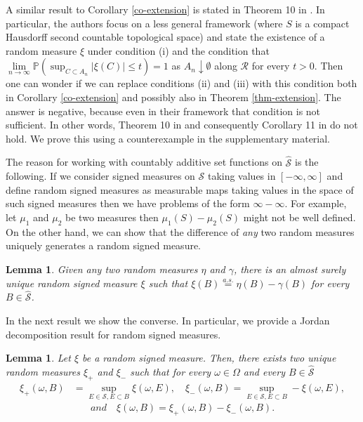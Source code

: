 \documentclass{article}
\theoremstyle{plain}
\newtheorem{lemma}[theorem]{Lemma}
\theoremstyle{remark}
\begin{document}
A similar result to Corollary \ref{co-extension} is stated in Theorem 10 in \citet{Jacob1995}. In particular, the authors focus on a less general framework (where $S$ is a compact Hausdorff second countable topological space) and state the existence of a random measure $\xi$ under condition (i) and the condition that $\lim\limits_{n\to\infty}\mathbb{P}(\sup_{C\subset A_n}|\xi(C)|\leq t)=1$ as $A_n\downarrow\emptyset$ along $\mathcal{R}$ for every $t>0$. Then one can wonder if we can replace conditions (ii) and (iii) with this condition both in Corollary \ref{co-extension} and possibly also in Theorem \ref{thm-extension}. The answer is negative, because even in their framework that condition is not sufficient. In other words, Theorem 10 in \citet{Jacob1995} and consequently Corollary 11 in \citet{Jacob1995} do not hold. We prove this using a counterexample in the supplementary material.

The reason for working with countably additive set functions on $\hat{\mathcal{S}}$ is the following. If we consider signed measures on $\mathcal{S}$ taking values in $[-\infty,\infty]$ and define random signed measures as measurable maps taking values in the space of such signed measures then we have problems of the form $\infty-\infty$. For example, let $\mu_1$ and $\mu_2$ be two measures then $\mu_1(S)-\mu_2(S)$ might not be well defined. On the other hand, we can show that the difference of \textit{any} two random measures uniquely generates a random signed measure.



\begin{lemma}\label{lem-uncited-2}
	Given any two random measures $\eta$ and $\gamma$, there is an almost surely unique random signed measure $\xi$ such that $\xi(B)\stackrel{a.s.}{=} \eta(B)-\gamma(B)$ for every $B\in\hat{\mathcal{S}}$.
\end{lemma}


In the next result we show the converse. In particular, we provide a Jordan decomposition result for random signed measures.
\begin{lemma}\label{lem-Jordan}
	Let $\xi$ be a random signed measure. Then, there exists two unique random measures $\xi_+$ and $\xi_-$ such that for every $\omega\in\Omega$ and every $B\in\hat{\mathcal{S}}$
	\begin{align*}
		\xi_+(\omega,B)&=\sup_{E\in \mathcal{S}, E\subset B}\xi(\omega,E),\quad
		\xi_-(\omega,B)=\sup_{E\in \mathcal{S}, E\subset B}-\xi(\omega,E),
	\end{align*}
	\begin{equation*}
		and\quad\xi(\omega,B)=\xi_+(\omega,B)-\xi_-(\omega,B).
	\end{equation*}
\end{lemma}
\end{document}
